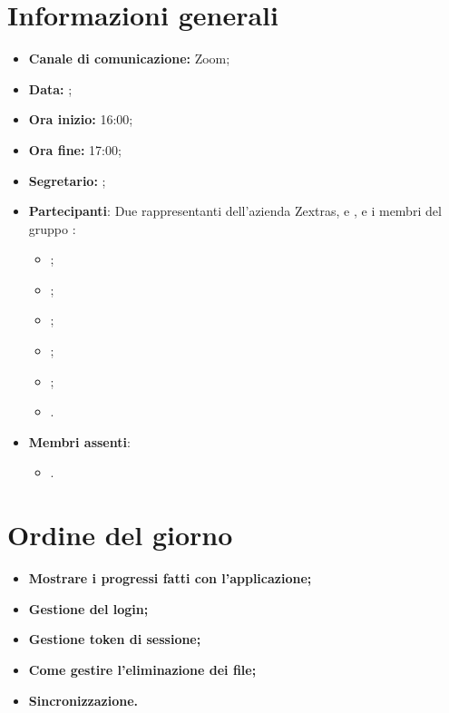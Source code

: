 \section{Informazioni generali}

\begin{itemize}

    \item \textbf{Canale di comunicazione:} Zoom;

    \item \textbf{Data:} \DataMeeting{};

    \item \textbf{Ora inizio:} 16:00;

    \item \textbf{Ora fine:} 17:00;

    \item \textbf{Segretario:} \ACapoRedazione{};

    \item \textbf{Partecipanti}: Due rappresentanti dell'azienda Zextras, \Alessio{} e \Federico{}, e i membri del gruppo \Gruppo{}:
        \begin{itemize}
            \item \Daniele{};
            \item \Davide{};
            \item \Francesco{};
            \item \Giosue{};
            \item \Lucrezia{};
            \item \Matteo{}.
        \end{itemize}
    \item \textbf{Membri assenti}:
        \begin{itemize}
            \item \Tommaso{}.
        \end{itemize}
\end{itemize}

\section{Ordine del giorno}

\begin{itemize}
    \item\textbf{Mostrare i progressi fatti con l'applicazione;}
    \item\textbf{Gestione del login;}
    \item\textbf{Gestione token di sessione;}
    \item\textbf{Come gestire l'eliminazione dei file;}
    \item\textbf{Sincronizzazione.}
\end{itemize}
\newpage


